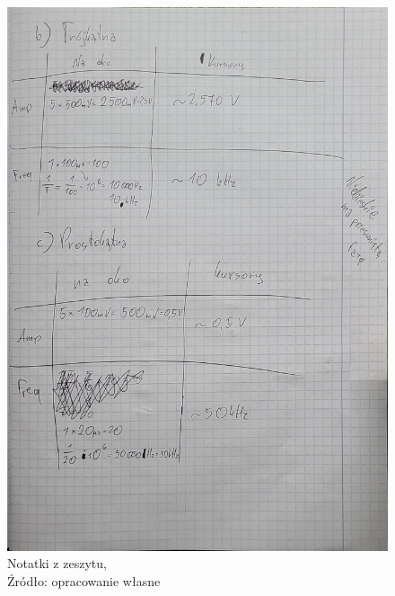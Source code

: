 \documentclass{article}
\begin{document}
\begin{figure}[h]
\begin{minipage}{0.45\textwidth}
        \includegraphics[width=1\textwidth]{grafiki/notatki2.jpg} 
        \caption{Notatki z zeszytu,\\Źródło: opracowanie własne}
    \end{minipage}
\end{figure}

    
\end{document}
